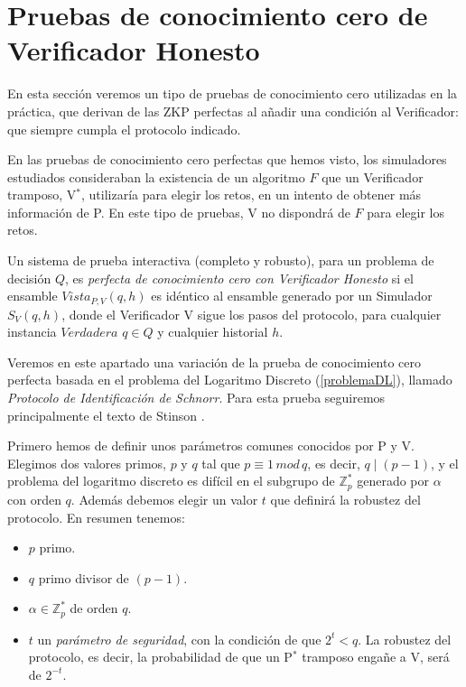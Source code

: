 \hfil


\section{Pruebas de conocimiento cero de Verificador Honesto}\label{honestVer:sec}



En esta sección veremos un tipo de pruebas de conocimiento cero utilizadas en la práctica, que derivan de las ZKP perfectas al añadir una condición al Verificador: que siempre cumpla el protocolo indicado.

En las pruebas de conocimiento cero perfectas que hemos visto, los simuladores estudiados consideraban la existencia de un algoritmo $F$ que un Verificador tramposo, V$^*$, utilizaría para elegir los retos, en un intento de obtener más información de P. En este tipo de pruebas, V no dispondrá de $F$ para elegir los retos.


\begin{definition}
	\hfil
	
	Un sistema de prueba interactiva (completo y robusto), para un problema de decisión $Q$, es \textit{perfecta de conocimiento cero con Verificador Honesto} si el ensamble $Vista_{P,V}(q,h)$ es idéntico al ensamble generado por un Simulador $S_{V}(q,h)$, donde el Verificador V sigue los pasos del protocolo, para cualquier instancia $Verdadera$ $q\in Q$ y cualquier historial $h$.
\end{definition}

\hfil

Veremos en este apartado una variación de la prueba de conocimiento cero perfecta basada en el problema del Logaritmo Discreto (\ref{problemaDL}), llamado \textit{Protocolo de Identificación de Schnorr}. Para esta prueba seguiremos principalmente el texto de Stinson \citep[Section 9.4]{stinson2005cryptography}.

Primero hemos de definir unos parámetros comunes conocidos por P y V. Elegimos dos valores primos, $p$ y $q$ tal que $p\equiv 1 \, mod \, q$, es decir, $q\mid (p-1)$, y el problema del logaritmo discreto es difícil en el subgrupo de $\mathbb{Z}_p^*$ generado por $\alpha$ con orden $q$. Además debemos elegir un valor $t$ que definirá la robustez del protocolo. En resumen tenemos:

\begin{itemize}
	\item $p$ primo.
	\item $q$ primo divisor de $(p-1)$.
	\item $\alpha \in \mathbb{Z}_p^*$ de orden $q$.
	\item $t$ un \textit{parámetro de seguridad}, con la condición de que $2^t < q$. La robustez del protocolo, es decir, la probabilidad de que un P$^*$ tramposo engañe a V, será de $2^{-t}$.
\end{itemize}


